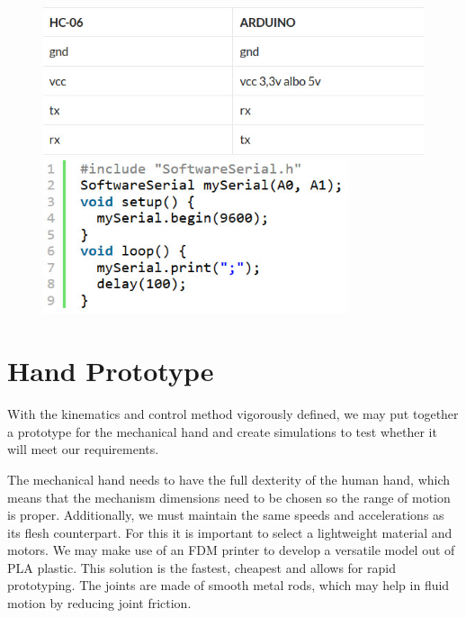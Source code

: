 \documentclass{article}
\begin{document}
\begin{figure}[!hb]
    \begin{minipage}[b]{0.49\textwidth}
    	\centering
		\includegraphics[width=\textwidth]{IMG/BT.jpeg}
	\end{minipage}
    \hfill
    \begin{minipage}[b]{0.49\textwidth}
    	\centering
		\includegraphics[width=0.8\textwidth]{IMG/BT_02.jpeg}
	\end{minipage}
\end{figure}

\section{Hand Prototype}
With the kinematics and control method vigorously defined, we may put together a prototype for the mechanical hand and create simulations to test whether it will meet our requirements.

The mechanical hand needs to have the full dexterity of the human hand, which means that the mechanism dimensions need to be chosen so the range of motion is proper. Additionally, we must maintain the same speeds and accelerations as its flesh counterpart. For this it is important to select a lightweight material and motors. We may make use of an FDM printer to develop a versatile model out of PLA plastic. This solution is the fastest, cheapest and allows for rapid prototyping. The joints are made of smooth metal rods, which may help in fluid motion by reducing joint friction.
\end{document}
